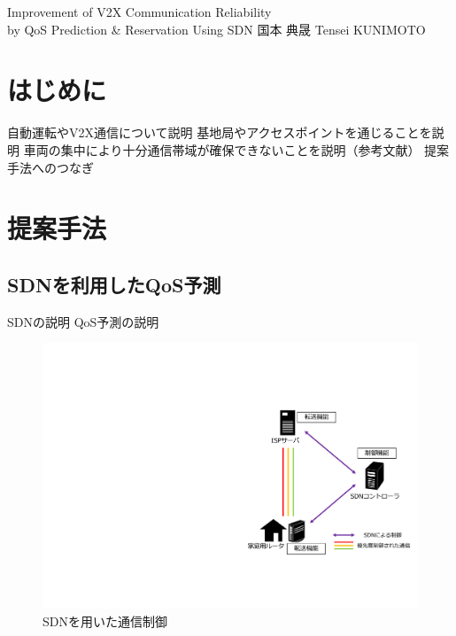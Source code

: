 \documentclass[a4paper,10pt,twocolumn,uplatex]{jsarticle}
\date{8}
\begin{document}
{Improvement of V2X Communication Reliability\\by QoS Prediction \& Reservation Using SDN}
{国本 典晟}
{Tensei KUNIMOTO}

\section{はじめに}
自動運転やV2X通信について説明
基地局やアクセスポイントを通じることを説明
車両の集中により十分通信帯域が確保できないことを説明（参考文献）
提案手法へのつなぎ

\section{提案手法}
\subsection{SDNを利用したQoS予測}
SDNの説明
QoS予測の説明

\begin{figure}[t]
	\begin{centering}
    \includegraphics[width=0.7\linewidth]{img/proposal_resume.pdf}
    \caption{SDNを用いた通信制御}
    \label{fig:proposal}
    \end{centering}
\end{figure}
\end{document}
